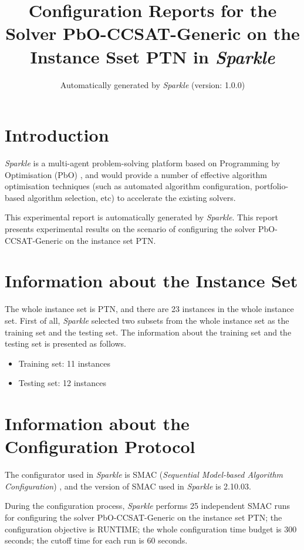 \documentclass[british]{article}
\title{Configuration Reports for the Solver PbO-CCSAT-Generic on the Instance Sset PTN in \emph{Sparkle} }
\author{ Automatically generated by \emph{Sparkle} (version: 1.0.0) }
\begin{document}
\maketitle %


\section{Introduction}
\label{sec:Introduction}

\emph{Sparkle} \cite{Hoos15} is a multi-agent problem-solving platform based on Programming by Optimisation (PbO) \cite{Hoos12}, and would provide a number of effective algorithm optimisation techniques (such as automated algorithm configuration, portfolio-based algorithm selection, etc) to accelerate the existing solvers.

This experimental report is automatically generated by \emph{Sparkle}. This report presents experimental results on the scenario of configuring the solver PbO-CCSAT-Generic on the instance set PTN.

\section{Information about the Instance Set}

The whole instance set is PTN, and there are 23 instances in the whole instance set. First of all, \emph{Sparkle} selected two subsets from the whole instance set as the training set and the testing set. The information about the training set and the testing set is presented as follows.

\begin{itemize}
\item Training set: 11 instances
\item Testing set: 12 instances
\end{itemize}

\section{Information about the Configuration Protocol}

The configurator used in \emph{Sparkle} is SMAC ({\em Sequential Model-based Algorithm Configuration}) \cite{HutEtAl11}, and the version of SMAC used in \emph{Sparkle} is 2.10.03.

During the configuration process, \emph{Sparkle} performs 25 independent SMAC runs for configuring the solver PbO-CCSAT-Generic on the instance set PTN; the configuration objective is RUNTIME; the whole configuration time budget is 300 seconds; the cutoff time for each run is 60 seconds.
\end{document}
